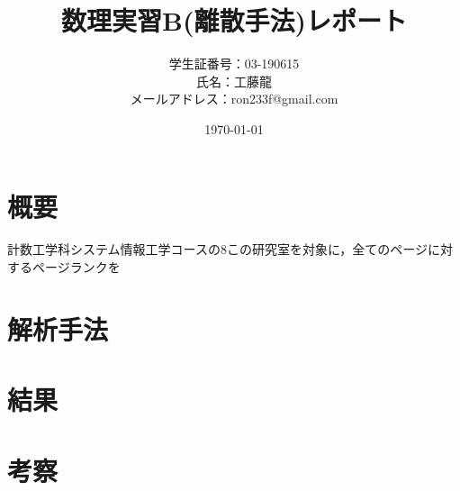 \documentclass[11pt,a4paper]{jsarticle}
\title{数理実習B(離散手法)レポート}
\author{学生証番号：03-190615\\氏名：工藤龍\\メールアドレス：ron233f@gmail.com}
\date{\today}
\begin{document}
\maketitle

\section{概要}
計数工学科システム情報工学コースの8この研究室を対象に，全てのページに対するページランクを

\section{解析手法}

\section{結果}

\section{考察}
\end{document}

